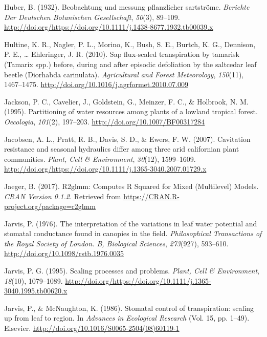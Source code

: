 \documentclass[11pt,twoside]{reedthesis}
\begin{document}
\hypertarget{ref-Huber1932}{}
Huber, B. (1932). Beobachtung und messung pflanzlicher sartströme.
\emph{Berichte Der Deutschen Botanischen Gesellschaft}, \emph{50}(3),
89--109.
\url{http://doi.org/https://doi.org/10.1111/j.1438-8677.1932.tb00039.x}

\hypertarget{ref-Hultine2010}{}
Hultine, K. R., Nagler, P. L., Morino, K., Bush, S. E., Burtch, K. G.,
Dennison, P. E., \ldots{} Ehleringer, J. R. (2010). Sap flux-scaled
transpiration by tamarisk (Tamarix spp.) before, during and after
episodic defoliation by the saltcedar leaf beetle (Diorhabda
carinulata). \emph{Agricultural and Forest Meteorology}, \emph{150}(11),
1467--1475. \url{http://doi.org/10.1016/j.agrformet.2010.07.009}

\hypertarget{ref-jackson_partitioning_1995}{}
Jackson, P. C., Cavelier, J., Goldstein, G., Meinzer, F. C., \&
Holbrook, N. M. (1995). Partitioning of water resources among plants of
a lowland tropical forest. \emph{Oecologia}, \emph{101}(2), 197--203.
\url{http://doi.org/10.1007/BF00317284}

\hypertarget{ref-Jacobsen2007}{}
Jacobsen, A. L., Pratt, R. B., Davis, S. D., \& Ewers, F. W. (2007).
Cavitation resistance and seasonal hydraulics differ among three arid
californian plant communities. \emph{Plant, Cell \& Environment},
\emph{30}(12), 1599--1609.
\url{http://doi.org/https://doi.org/10.1111/j.1365-3040.2007.01729.x}

\hypertarget{ref-jaeger_r2glmm_2017}{}
Jaeger, B. (2017). R2glmm: Computes R Squared for Mixed (Multilevel)
Models. \emph{CRAN Version 0.1.2.} Retrieved from
\url{https://CRAN.R-project.org/package=r2glmm}

\hypertarget{ref-jarvis_interpretation_1976}{}
Jarvis, P. (1976). The interpretation of the variations in leaf water
potential and stomatal conductance found in canopies in the field.
\emph{Philosophical Transactions of the Royal Society of London. B,
Biological Sciences}, \emph{273}(927), 593--610.
\url{http://doi.org/10.1098/rstb.1976.0035}

\hypertarget{ref-Jarvis1995}{}
Jarvis, P. G. (1995). Scaling processes and problems. \emph{Plant, Cell
\& Environment}, \emph{18}(10), 1079--1089.
\url{http://doi.org/https://doi.org/10.1111/j.1365-3040.1995.tb00620.x}

\hypertarget{ref-jarvis_stomatal_1986}{}
Jarvis, P., \& McNaughton, K. (1986). Stomatal control of transpiration:
scaling up from leaf to region. In \emph{Advances in Ecological
Research} (Vol. 15, pp. 1--49). Elsevier.
\url{http://doi.org/10.1016/S0065-2504(08)60119-1}
\end{document}
